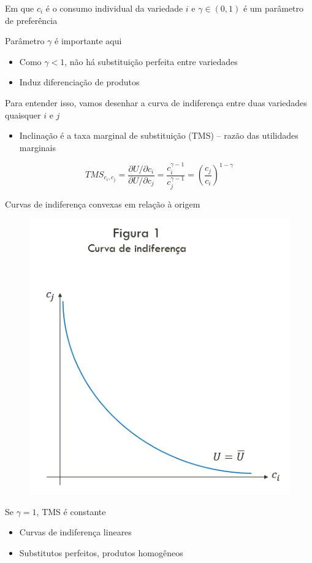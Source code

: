 \documentclass[a4paper,12pt]{article}[abntex2]
\begin{document}
Em que \(c_i\) é o consumo individual da variedade \(i\) e \(\gamma \in (0, 1)\) é um parâmetro de preferência

Parâmetro \(\gamma\) é importante aqui
\begin{itemize}
    \item Como \(\gamma < 1\), não há substituição perfeita entre variedades
    \item Induz diferenciação de produtos
\end{itemize}

Para entender isso, vamos desenhar a curva de indiferença entre duas variedades quaisquer \(i\) e \(j\)
\begin{itemize}
    \item Inclinação é a taxa marginal de substituição (TMS) – razão das utilidades marginais
\end{itemize}

\[
TMS_{c_i, c_j} = \frac{\partial U/\partial c_i}{\partial U/\partial c_j} = \frac{c_i^{\gamma - 1}}{c_j^{\gamma - 1}} = \left(\frac{c_j}{c_i}\right)^{1 - \gamma}
\]

Curvas de indiferença convexas em relação à origem

\begin{figure}[H]
    \centering
    \includegraphics[width=0.7\linewidth]{Imagens/a16i5.png}
\end{figure}

Se \(\gamma = 1\), TMS é constante
\begin{itemize}
    \item Curvas de indiferença lineares
    \item Substitutos perfeitos, produtos homogêneos
\end{itemize}
\end{document}

